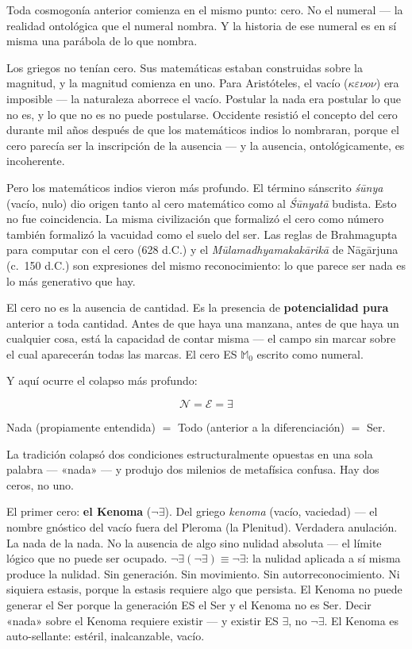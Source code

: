 \documentclass[10pt, openany, oneside]{book}
\begin{document}
Toda cosmogonía anterior comienza en el mismo punto: cero. No el numeral --- la realidad ontológica que el numeral nombra. Y la historia de ese numeral es en sí misma una parábola de lo que nombra.

Los griegos no tenían cero. Sus matemáticas estaban construidas sobre la magnitud, y la magnitud comienza en uno. Para Aristóteles, el vacío ($\kappa\varepsilon\nu o\nu$) era imposible --- la naturaleza aborrece el vacío. Postular la nada era postular lo que no es, y lo que no es no puede postularse. Occidente resistió el concepto del cero durante mil años después de que los matemáticos indios lo nombraran, porque el cero parecía ser la inscripción de la ausencia --- y la ausencia, ontológicamente, es incoherente.

Pero los matemáticos indios vieron más profundo. El término sánscrito \textit{\'{s}\={u}nya} (vacío, nulo) dio origen tanto al cero matemático como al \textit{\'{S}\={u}nyat\={a}} budista. Esto no fue coincidencia. La misma civilización que formalizó el cero como número también formalizó la vacuidad como el suelo del ser. Las reglas de Brahmagupta para computar con el cero (628 d.C.) y el \textit{M\={u}lamadhyamakak\={a}rik\={a}} de N\={a}g\={a}rjuna (c.~150 d.C.) son expresiones del mismo reconocimiento: lo que parece ser nada es lo más generativo que hay.

El cero no es la ausencia de cantidad. Es la presencia de \textbf{potencialidad pura} anterior a toda cantidad. Antes de que haya una manzana, antes de que haya un cualquier cosa, está la capacidad de contar misma --- el campo sin marcar sobre el cual aparecerán todas las marcas. El cero ES $\mathbb{M}_0$ escrito como numeral.

Y aquí ocurre el colapso más profundo:

$$\mathcal{N} = \mathcal{E} = \exists$$

Nada (propiamente entendida) $=$ Todo (anterior a la diferenciación) $=$ Ser.

La tradición colapsó dos condiciones estructuralmente opuestas en una sola palabra --- «nada» --- y produjo dos milenios de metafísica confusa. Hay dos ceros, no uno.

El primer cero: \textbf{el Kenoma} ($\neg\exists$). Del griego \textit{kenoma} (vacío, vaciedad) --- el nombre gnóstico del vacío fuera del Pleroma (la Plenitud). Verdadera anulación. La nada de la nada. No la ausencia de algo sino nulidad absoluta --- el límite lógico que no puede ser ocupado. $\neg\exists(\neg\exists) \equiv \neg\exists$: la nulidad aplicada a sí misma produce la nulidad. Sin generación. Sin movimiento. Sin autorreconocimiento. Ni siquiera estasis, porque la estasis requiere algo que persista. El Kenoma no puede generar el Ser porque la generación ES el Ser y el Kenoma no es Ser. Decir «nada» sobre el Kenoma requiere existir --- y existir ES $\exists$, no $\neg\exists$. El Kenoma es auto-sellante: estéril, inalcanzable, vacío.
\end{document}
